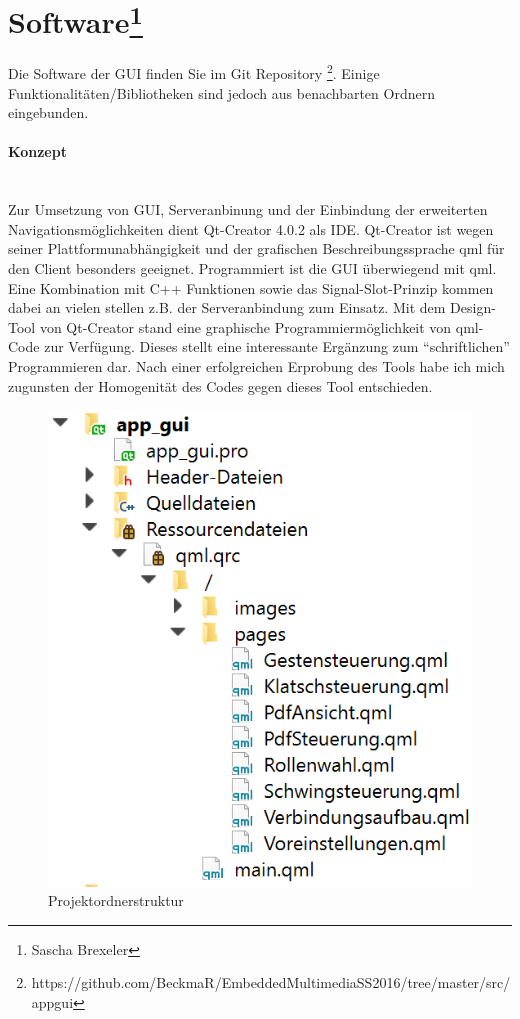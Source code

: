 \section[Software]{Software\footnote{Sascha Brexeler}}
\label{guiSoftware}
Die Software der GUI finden Sie im Git Repository \footnote{https://github.com/BeckmaR/EmbeddedMultimediaSS2016/tree/master/src/app\textunderscore gui}. Einige Funktionalitäten/Bibliotheken sind jedoch aus benachbarten Ordnern eingebunden.

\paragraph{Konzept}$\;$\\
Zur Umsetzung von GUI, Serveranbinung und der Einbindung der erweiterten Navigationsmöglichkeiten dient Qt-Creator 4.0.2 als IDE. Qt-Creator ist wegen seiner Plattformunabhängigkeit und der grafischen Beschreibungssprache qml für den Client besonders geeignet. Programmiert ist die GUI überwiegend mit qml. Eine Kombination mit C++ Funktionen sowie das Signal-Slot-Prinzip kommen dabei an vielen stellen z.B. der Serveranbindung zum Einsatz. Mit dem Design-Tool von Qt-Creator stand eine graphische Programmiermöglichkeit von qml-Code zur Verfügung. Dieses stellt eine interessante Ergänzung zum "`schriftlichen"' Programmieren dar. Nach einer erfolgreichen Erprobung des Tools habe ich mich zugunsten der Homogenität des Codes gegen dieses Tool entschieden.
\begin{figure}[ht!]
	\centering
	\includegraphics[scale=0.8]{GUI/Bilder/Projektordnerstruktur.PNG}
	\caption{Projektordnerstruktur {\tiny}}
	\label{client:Projektordnerstruktur}
\end{figure}


